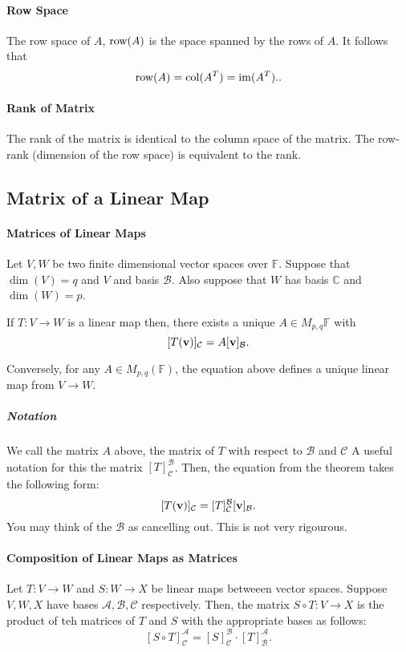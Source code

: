 \paragraph{Row Space}
The row space of \(A\), \(\mathrm{row}(A)\) is the space spanned by the rows of \(A\).
It follows that \[
    \mathrm{row}(A) = \mathrm{col}(A^T) = \mathrm{im}(A^T).
.\] 

\paragraph{Rank of Matrix}
The rank of the matrix is identical to the column space of the matrix.
The row-rank (dimension of the row space) is equivalent to the rank.

\subsection{Matrix of a Linear Map}

\paragraph{Matrices of Linear Maps}
Let \(V, W\) be two finite dimensional vector spaces over \( \mathbb{F} \).
Suppose that \(\dim(V) = q\) and \(V\) and basis \(\mathcal{B}\).
Also suppose that \(W\) has basis \(\mathbb{C}\) and \(\dim(W) = p\).

If \(T: V \to W\) is a linear map then, there exists a unique
\(A \in M_{p, q} \mathbb{F}\) with
\[
    [T(\mathbf{v})]_\mathcal{C} = A[\mathbf{v}]_\mathcal{B}
.\]

Conversely, for any \(A\in M_{p, q}(\mathbb{F})\), the equation
above defines a unique linear map from \(V \to W\).

\subparagraph{Notation}
We call the matrix \(A\) above, the matrix of \(T\) with respect
to \(\mathcal{B}\) and \(\mathcal{C}\)
A useful notation for this the matrix \([T]_\mathcal{C}^\mathcal{B}\).
Then, the equation from the theorem takes the following form: \[
    [T(\mathbf{v})]_\mathcal{C}
    =
    [T]_\mathcal{C}^\mathcal{B} [\mathbf{v}]_\mathcal{B}
.\]
You may think of the \(\mathcal{B}\) as cancelling out. This is not very rigourous.

\paragraph{Composition of Linear Maps as Matrices}
Let \(T: V \to W\) and \(S: W \to X\) be linear maps betweeen vector spaces.
Suppose \(V, W, X\) have bases \(\mathcal{A}, \mathcal{B}, \mathcal{C}\)
respectively.
Then, the matrix \(S \circ T : V \to X\) is the product of teh matrices of
\(T\) and \(S\) with the appropriate bases as follows:
\[
   [S \circ T]_\mathcal{C}^\mathcal{A}
   =
   [S]_\mathcal{C}^\mathcal{B} \cdot [T]_\mathcal{B}^\mathcal{A}
.\]

